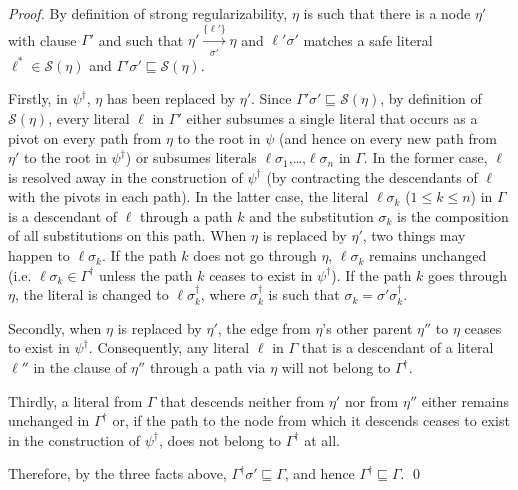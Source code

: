 \begin{proof} 
By definition of strong regularizability, $\eta$ is such
that there is a node $\eta'$ with clause $\Gamma'$ and such that
$\eta' \xrightarrow[\sigma']{\{\ell'\} } \eta$ and $\ell'\sigma'$
matches a safe literal $\ell^*\in \mathcal{S}(\eta)$ and
$\Gamma' \sigma' \sqsubseteq \mathcal{S}(\eta)$.

Firstly, in $\psi^{\dagger}$, $\eta$ has been replaced by $\eta'$. Since
$\Gamma' \sigma' \sqsubseteq \mathcal{S}(\eta)$, by definition of
$\mathcal{S}(\eta)$, every literal $\ell$ in $\Gamma'$ either subsumes %
a single literal that occurs as a pivot on every path
from $\eta$ to the root in $\psi$ (and hence on every new path from
$\eta'$ to the root in $\psi^{\dagger}$) or subsumes literals %
$\ell \sigma_1$,\ldots,$\ell\sigma_n$ in $\Gamma$. In the former case,
$\ell$ is resolved away in the construction of $\psi^{\dagger}$ (by
contracting the descendants of $\ell$ with the pivots in each path).
In the latter case, the literal $\ell \sigma_k$ ($1 \leq k \leq n$) in
$\Gamma$ is a descendant of $\ell$ through a path $k$ and the
substitution $\sigma_k$ is the composition of all substitutions on
this path. When $\eta$ is replaced by $\eta'$, two things may happen
to $\ell \sigma_k$. If the path $k$ does not go through $\eta$, 
$\ell \sigma_k$ remains unchanged (i.e. $\ell \sigma_k \in \Gamma^{\dagger}$
unless the path $k$ ceases to exist in $\psi^{\dagger}$). If the path
$k$ goes through $\eta$, the literal is changed to 
$\ell\sigma^{\dagger}_k$, where $\sigma^{\dagger}_k$ is such that 
$\sigma_k = \sigma' \sigma^{\dagger}_k$.

Secondly, when $\eta$ is replaced by $\eta'$, the edge from
$\eta$'s other parent $\eta''$ to $\eta$ ceases to exist in
$\psi^{\dagger}$. Consequently, any literal $\ell$ in $\Gamma$ that is a
descendant of a literal $\ell''$ in the clause of $\eta''$ through a
path via $\eta$ will not belong to $\Gamma^{\dagger}$.


Thirdly, a literal from $\Gamma$ that descends neither from $\eta'$ nor from $\eta''$ either remains unchanged in $\Gamma^{\dagger}$ or, if the path to the node from which it descends ceases to exist in the construction of $\psi^{\dagger}$, does not belong to $\Gamma^{\dagger}$ at all.

Therefore, by the three facts above, $\Gamma^{\dagger} \sigma' \sqsubseteq \Gamma$, and hence $\Gamma^{\dagger} \sqsubseteq \Gamma$. \qed
\end{proof}


